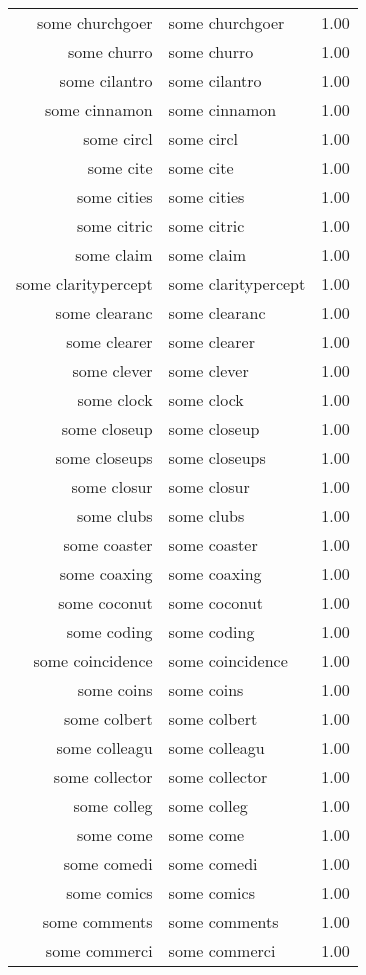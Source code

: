 \begin{table}[ht]
\begin{tabular}{rlr}
  some churchgoer & some churchgoer & 1.00 \\ 
  some churro & some churro & 1.00 \\ 
  some cilantro & some cilantro & 1.00 \\ 
  some cinnamon & some cinnamon & 1.00 \\ 
  some circl & some circl & 1.00 \\ 
  some cite & some cite & 1.00 \\ 
  some cities & some cities & 1.00 \\ 
  some citric & some citric & 1.00 \\ 
  some claim & some claim & 1.00 \\ 
  some claritypercept & some claritypercept & 1.00 \\ 
  some clearanc & some clearanc & 1.00 \\ 
  some clearer & some clearer & 1.00 \\ 
  some clever & some clever & 1.00 \\ 
  some clock & some clock & 1.00 \\ 
  some closeup & some closeup & 1.00 \\ 
  some closeups & some closeups & 1.00 \\ 
  some closur & some closur & 1.00 \\ 
  some clubs & some clubs & 1.00 \\ 
  some coaster & some coaster & 1.00 \\ 
  some coaxing & some coaxing & 1.00 \\ 
  some coconut & some coconut & 1.00 \\ 
  some coding & some coding & 1.00 \\ 
  some coincidence & some coincidence & 1.00 \\ 
  some coins & some coins & 1.00 \\ 
  some colbert & some colbert & 1.00 \\ 
  some colleagu & some colleagu & 1.00 \\ 
  some collector & some collector & 1.00 \\ 
  some colleg & some colleg & 1.00 \\ 
  some come & some come & 1.00 \\ 
  some comedi & some comedi & 1.00 \\ 
  some comics & some comics & 1.00 \\ 
  some comments & some comments & 1.00 \\ 
  some commerci & some commerci & 1.00 \\ 

\end{tabular}
\end{table}
